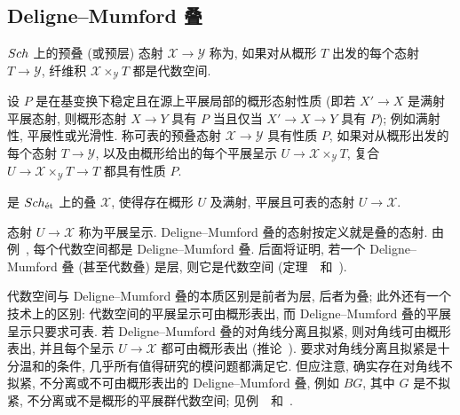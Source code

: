 \subsection{Deligne--Mumford 叠}\label{src:4.1.2-subsection}
\begin{definition}[可表态射及其性质]\label{src:4.1.3}
$Sch$ 上的预叠 (或预层) 态射 $\mathcal X\to\mathcal Y$ 称为, 如果对从概形 $T$ 出发的每个态射 $T\to\mathcal Y$, 纤维积 $\mathcal X\times_{\mathcal Y}T$ 都是代数空间.

设 $P$ 是在基变换下稳定且在源上平展局部的概形态射性质 (即若 $X'\to X$ 是满射平展态射, 则概形态射 $X\to Y$ 具有 $P$ 当且仅当 $X'\to X\to Y$ 具有 $P$); 例如满射性, 平展性或光滑性. 称可表的预叠态射 $\mathcal X\to\mathcal Y$ 具有性质 $P$, 如果对从概形出发的每个态射 $T\to\mathcal Y$, 以及由概形给出的每个平展呈示 $U\to\mathcal X\times_{\mathcal Y}T$, 复合 $U\to\mathcal X\times_{\mathcal Y}T\to T$ 都具有性质 $P$.
\end{definition}
\begin{definition}\label{src:4.1.4}
是 $Sch_{\text{ét}}$ 上的叠 $\mathcal X$, 使得存在概形 $U$ 及满射, 平展且可表的态射 $U\to\mathcal X$.

态射 $U\to\mathcal X$ 称为平展呈示. Deligne--Mumford 叠的态射按定义就是叠的态射. 由例~, 每个代数空间都是 Deligne--Mumford 叠. 后面将证明, 若一个 Deligne--Mumford 叠 (甚至代数叠) 是层, 则它是代数空间 (定理~~和~).
\end{definition}
\begin{remark}\label{src:4.1.5}
代数空间与 Deligne--Mumford 叠的本质区别是前者为层, 后者为叠; 此外还有一个技术上的区别: 代数空间的平展呈示可由概形表出, 而 Deligne--Mumford 叠的平展呈示只要求可表. 若 Deligne--Mumford 叠的对角线分离且拟紧, 则对角线可由概形表出, 并且每个呈示 $U\to\mathcal X$ 都可由概形表出 (推论~). 要求对角线分离且拟紧是十分温和的条件, 几乎所有值得研究的模问题都满足它. 但应注意, 确实存在对角线不拟紧, 不分离或不可由概形表出的 Deligne--Mumford 叠, 例如 $BG$, 其中 $G$ 是不拟紧, 不分离或不是概形的平展群代数空间; 见例~~和~.
\end{remark}

